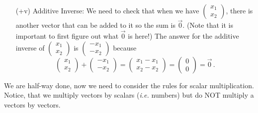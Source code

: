{\begin{enumerate}
\[
\vec 0 = \begin{pmatrix}0\\0\end{pmatrix}\, .
\]
You can easily  check that when this vector is added to any vector, the result is unchanged.
\item[(+v)] Additive Inverse: We need to check that when we have 
$\begin{pmatrix}x_1\\x_2\end{pmatrix}$, there is another vector 
that can be added to it so the sum is $\vec 0$. (Note that it is important to first figure out what $\vec 0$ is here!) The answer for the additive inverse of $\begin{pmatrix}x_1\\x_2\end{pmatrix}$ is
$
\begin{pmatrix}-x_1\\-x_2\end{pmatrix}
$
because
\[
\begin{pmatrix}x_1\\x_2\end{pmatrix}+
\begin{pmatrix}-x_1\\-x_2\end{pmatrix}
=\begin{pmatrix}x_1-x_1\\x_2-x_2\end{pmatrix}=
\begin{pmatrix}0\\0\end{pmatrix}=\vec 0\, .
\]
\end{enumerate}
We are half-way done, now we need to consider the rules for scalar multiplication. Notice, that we multiply vectors by scalars
({\itshape i.e.} numbers) but do NOT multiply a vectors by  vectors.

}
